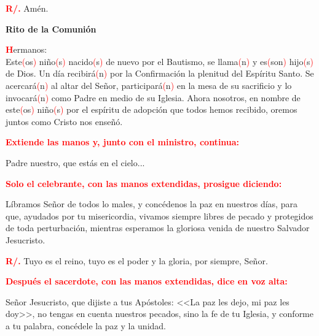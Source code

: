 \documentclass[12pt, letterpaper]{report}
\begin{document}
\Large \hspace{-0.9cm} {\bfseries \textcolor{red}{R/.}} \hspace{0.5cm} Am\'en.

\newpage

\begin{center}
\Huge {\bfseries Rito de la Comuni\'on}
\end{center}

\lettrine[lines=1]{\bfseries \textcolor{red}{H}}{}\Large ermanos: \\
Este\textcolor{red}{(}os\textcolor{red}{)} ni\~no\textcolor{red}{(}s\textcolor{red}{)} nacido\textcolor{red}{(}s\textcolor{red}{)} de nuevo por el Bautismo, se llama\textcolor{red}{(}n\textcolor{red}{)} y es\textcolor{red}{(}son\textcolor{red}{)} hijo\textcolor{red}{(}s\textcolor{red}{)} de Dios. Un d\'ia recibir\'a\textcolor{red}{(}n\textcolor{red}{)} por la Confirmaci\'on la plenitud del Esp\'iritu Santo. Se acercar\'a\textcolor{red}{(}n\textcolor{red}{)} al altar del Se\~nor, participar\'a\textcolor{red}{(}n\textcolor{red}{)} en la mesa de su sacrificio y lo invocar\'a\textcolor{red}{(}n\textcolor{red}{)} como Padre en medio de su Iglesia. Ahora nosotros, en nombre de este\textcolor{red}{(}os\textcolor{red}{)} ni\~no\textcolor{red}{(}s\textcolor{red}{)} por el esp\'iritu de adopci\'on que todos hemos recibido, oremos juntos como Cristo nos ense\~n\'o.

\large{\bfseries \textcolor{red}{Extiende las manos y, junto con el ministro, continua:}}

\Large Padre nuestro, que est\'as en el cielo...

\large{\bfseries \textcolor{red}{Solo el celebrante, con las manos extendidas, prosigue diciendo:}}

\Large L\'ibramos Se\~nor de todos lo males, y conc\'edenos la paz en nuestros d\'ias, para que, ayudados por tu misericordia, vivamos siempre libres de pecado y protegidos de toda perturbaci\'on, mientras esperamos la gloriosa venida de nuestro Salvador Jesucristo.

\noindent
\Large {\bfseries \textcolor{red}{R/.}} \hspace{0.5cm} Tuyo es el reino, tuyo es el poder y la gloria, por siempre, Se\~nor.

\large{\bfseries \textcolor{red}{Despu\'es el sacerdote, con las manos extendidas, dice en voz alta:}}

\Large Se\~nor Jesucristo, que dijiste a tus Ap\'ostoles: <<La paz les dejo, mi paz les doy>>, no tengas en cuenta nuestros pecados, sino la fe de tu Iglesia, y conforme a tu palabra, conc\'edele la paz y la unidad.
\end{document}
